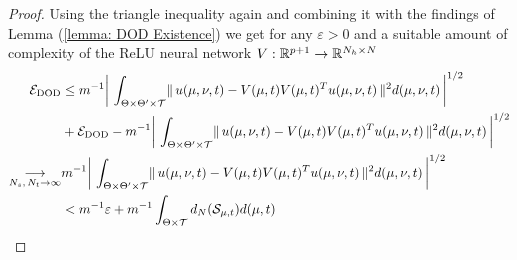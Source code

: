 \begin{proof}
    Using the triangle inequality again and combining it with the findings of Lemma (\ref{lemma: DOD Existence}) we get for any $\varepsilon > 0$ and a suitable amount of complexity of the ReLU neural network $V: \mathbb{R}^{p+1} \to \mathbb{R}^{N_h \times N}$
    \begin{align*}
        \mathcal{E}_{\text{DOD}} &\leq m^{-1} \bigg\vert \, \int_{\Theta \times \Theta' \times \mathcal{T}} \lVert \, u(\mu, \nu, t) - V(\mu, t) V(\mu, t)^T u(\mu, \nu, t) \, \rVert^2 d(\mu, \nu, t) \, \bigg\vert^{1/2} \\
        &+ \mathcal{E}_{\text{DOD}} -  m^{-1} \bigg\vert \,  \int_{\Theta \times \Theta' \times \mathcal{T}} \lVert \, u(\mu, \nu, t) - V(\mu, t) V(\mu, t)^T u(\mu, \nu, t) \, \rVert^2 d(\mu, \nu, t) \, \bigg\vert^{1/2} \\
        \underset{N_s,\, N_t \to \infty}{\longrightarrow} &m^{-1} \bigg\vert \, \int_{\Theta \times \Theta' \times \mathcal{T}} \lVert \, u(\mu, \nu, t) - V(\mu, t) V(\mu, t)^T u(\mu, \nu, t) \, \rVert^2 d(\mu, \nu, t) \, \bigg\vert^{1/2} \\
        &< m^{-1}\varepsilon + m^{-1}\int_{\Theta \times \mathcal{T}} d_N(\mathcal{S}_{\mu, t}) d(\mu, t)
    \end{align*}

    
\end{proof}

